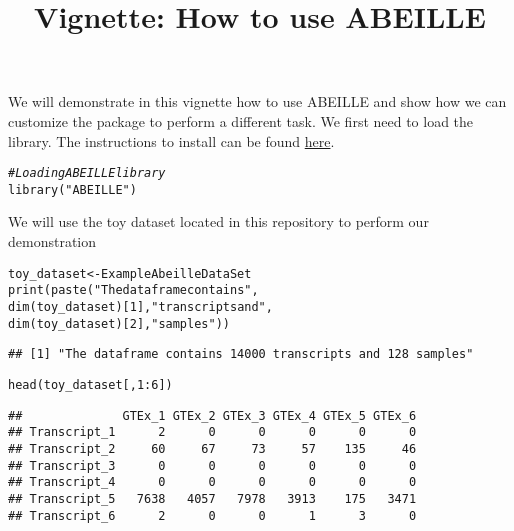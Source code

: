 \documentclass[9pt]{article}\usepackage[]{graphicx}\usepackage[usenames,dvipsnames]{color}
\title{Vignette: How to use ABEILLE}
\author{}
\date{}
\newcommand{\hlnum}[1]{\textcolor[rgb]{0.816,0.125,0.439}{#1}}%
\newcommand{\hlstr}[1]{\textcolor[rgb]{0.251,0.627,0.251}{#1}}%
\newcommand{\hlcom}[1]{\textcolor[rgb]{0.502,0.502,0.502}{\textit{#1}}}%
\newcommand{\hlopt}[1]{\textcolor[rgb]{0,0,0}{#1}}%
\newcommand{\hlstd}[1]{\textcolor[rgb]{0.251,0.251,0.251}{#1}}%
\newcommand{\hlkwb}[1]{\textcolor[rgb]{0,0,0}{#1}}%
\newcommand{\hlkwd}[1]{\textcolor[rgb]{0.878,0.439,0.125}{#1}}%
\newenvironment{knitrout}{}{} %
\begin{document}
\maketitle

We will demonstrate in this vignette how to use ABEILLE and show how we can customize the package to perform a different task. We first need to load the library. The instructions to install can be found \href{https://github.com/uca-mdlab/ABEILLE/blob/main/README.md}{here}.

\begin{knitrout}
\color{fgcolor}\begin{kframe}
\begin{alltt}
\hlcom{# Loading ABEILLE library}
\hlkwd{library}\hlstd{(}\hlstr{"ABEILLE"}\hlstd{)}
\end{alltt}
\end{kframe}
\end{knitrout}

We will use the toy dataset located in this repository to perform our demonstration

\begin{knitrout}
\color{fgcolor}\begin{kframe}
\begin{alltt}
\hlstd{toy_dataset} \hlkwb{<-} \hlstd{ExampleAbeilleDataSet}
\hlkwd{print}\hlstd{(}\hlkwd{paste}\hlstd{(}\hlstr{"The dataframe contains"}\hlstd{,}
            \hlkwd{dim}\hlstd{(toy_dataset)[}\hlnum{1}\hlstd{],}\hlstr{"transcripts and"}\hlstd{,}
            \hlkwd{dim}\hlstd{(toy_dataset)[}\hlnum{2}\hlstd{],}\hlstr{"samples"}\hlstd{))}
\end{alltt}
\begin{verbatim}
## [1] "The dataframe contains 14000 transcripts and 128 samples"
\end{verbatim}
\begin{alltt}
\hlkwd{head}\hlstd{(toy_dataset[,}\hlnum{1}\hlopt{:}\hlnum{6}\hlstd{])}
\end{alltt}
\begin{verbatim}
##              GTEx_1 GTEx_2 GTEx_3 GTEx_4 GTEx_5 GTEx_6
## Transcript_1      2      0      0      0      0      0
## Transcript_2     60     67     73     57    135     46
## Transcript_3      0      0      0      0      0      0
## Transcript_4      0      0      0      0      0      0
## Transcript_5   7638   4057   7978   3913    175   3471
## Transcript_6      2      0      0      1      3      0
\end{verbatim}
\end{kframe}
\end{knitrout}
\end{document}
